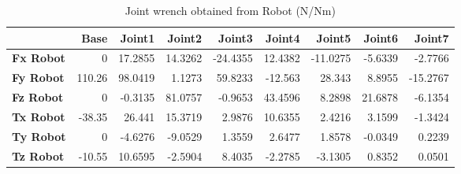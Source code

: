 \begin{table}[h!]
	\centering
	\caption{Joint wrench obtained from Robot (N/Nm)}
	\label{wrech_Robot_Pose4}
	\begin{tabular}{|l|r|r|r|r|r|r|r|r|}
		\hline
		\textbf{} & \textbf{Base} & \textbf{Joint1}  & \textbf{Joint2}  & \textbf{Joint3}  & \textbf{Joint4}  & \textbf{Joint5}  & \textbf{Joint6}  & \textbf{Joint7} \\ \hline
		\textbf{Fx Robot}  & 0        & 17.2855        & 14.3262        & -24.4355        & 12.4382        & -11.0275        & -5.6339        & -2.7766 \\ \hline
		\textbf{Fy Robot}  & 110.26        & 98.0419        & 1.1273        & 59.8233        & -12.563        & 28.343        & 8.8955        & -15.2767 \\ \hline
		\textbf{Fz Robot}  & 0        & -0.3135        & 81.0757        & -0.9653        & 43.4596        & 8.2898        & 21.6878        & -6.1354 \\ \hline
		\textbf{Tx Robot}  & -38.35        & 26.441        & 15.3719        & 2.9876        & 10.6355        & 2.4216        & 3.1599        & -1.3424 \\ \hline
		\textbf{Ty Robot}  & 0        & -4.6276        & -9.0529        & 1.3559        & 2.6477        & 1.8578        & -0.0349        & 0.2239 \\ \hline
		\textbf{Tz Robot}  & -10.55        & 10.6595        & -2.5904        & 8.4035        & -2.2785        & -3.1305        & 0.8352        & 0.0501 \\ \hline
	\end{tabular}
\end{table}

